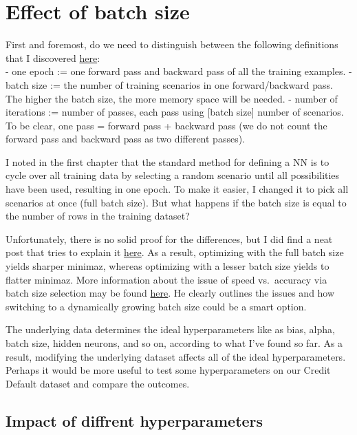 \documentclass[
]{book}
\begin{document}
\hypertarget{effect-of-batch-size}{%
\chapter{Effect of batch size}\label{effect-of-batch-size}}

First and foremost, do we need to distinguish between the following definitions that I discovered \href{https://stackoverflow.com/questions/4752626/epoch-vs-iteration-when-training-neural-networks}{here}:\\
- one epoch := one forward pass and backward pass of all the training examples.
- batch size := the number of training scenarios in one forward/backward pass. The higher the batch size, the more memory space will be needed.
- number of iterations := number of passes, each pass using {[}batch size{]} number of scenarios. To be clear, one pass = forward pass + backward pass (we do not count the forward pass and backward pass as two different passes).

I noted in the first chapter that the standard method for defining a NN is to cycle over all training data by selecting a random scenario until all possibilities have been used, resulting in one epoch. To make it easier, I changed it to pick all scenarios at once (full batch size). But what happens if the batch size is equal to the number of rows in the training dataset?

Unfortunately, there is no solid proof for the differences, but I did find a neat post that tries to explain it \href{https://stats.stackexchange.com/questions/164876/what-is-the-trade-off-between-batch-size-and-number-of-iterations-to-train-a-neu}{here}. As a result, optimizing with the full batch size yields sharper minimaz, whereas optimizing with a lesser batch size yields to flatter minimaz. More information about the issue of speed vs.~accuracy via batch size selection may be found \href{https://medium.com/mini-distill/effect-of-batch-size-on-training-dynamics-21c14f7a716e}{here}. He clearly outlines the issues and how switching to a dynamically growing batch size could be a smart option.

The underlying data determines the ideal hyperparameters like as bias, alpha, batch size, hidden neurons, and so on, according to what I've found so far. As a result, modifying the underlying dataset affects all of the ideal hyperparameters. Perhaps it would be more useful to test some hyperparameters on our Credit Default dataset and compare the outcomes.

\hypertarget{impact-of-diffrent-hyperparameters}{%
\section{Impact of diffrent hyperparameters}\label{impact-of-diffrent-hyperparameters}}
\end{document}
